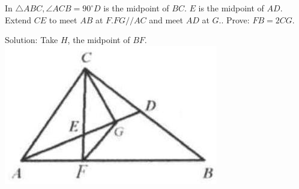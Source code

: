 \documentclass{article}
\begin{document}
In \(\triangle A B C, \angle A C B=90^{\circ} D\) is the midpoint of \(B C\). \(E\) is the midpoint of \(A D\). Extend \(C E\) to meet \(A B\) at \(F . F G / / A C\) and meet \(A D\) at \(G\).. Prove: \(F B=2 C G\).

Solution:
Take \(H\), the midpoint of \(B F\).\\
\centering
\includegraphics[width=\textwidth]{images/040(1).jpg}
\end{document}
